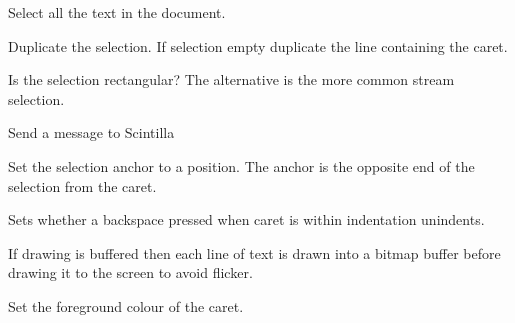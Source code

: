 Select all the text in the document.


\label{wxstyledtextctrlselectionduplicate}


Duplicate the selection. If selection empty duplicate the line containing the caret.


\label{wxstyledtextctrlselectionisrectangle}


Is the selection rectangular? The alternative is the more common stream selection.


\label{wxstyledtextctrlsendmsg}


Send a message to Scintilla


\label{wxstyledtextctrlsetanchor}


Set the selection anchor to a position. The anchor is the opposite
end of the selection from the caret.


\label{wxstyledtextctrlsetbackspaceunindents}


Sets whether a backspace pressed when caret is within indentation unindents.


\label{wxstyledtextctrlsetbuffereddraw}


If drawing is buffered then each line of text is drawn into a bitmap buffer
before drawing it to the screen to avoid flicker.


\label{wxstyledtextctrlsetcaretforeground}


Set the foreground colour of the caret.


\label{wxstyledtextctrlsetcaretlinebackalpha}

